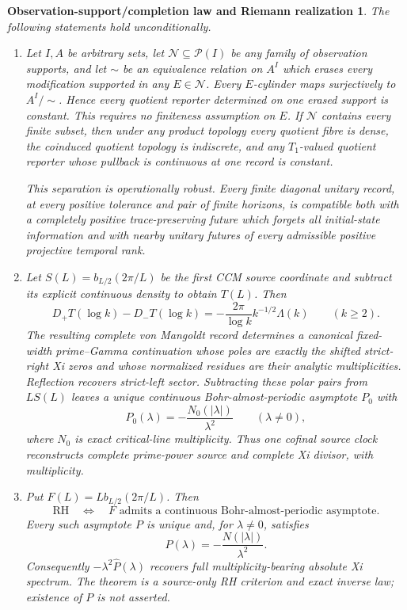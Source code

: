 \documentclass[11pt]{article}
\newtheorem*{maintheorem}{Observation-support/completion law and Riemann realization}
\theoremstyle{definition}
\theoremstyle{remark}
\begin{document}
\begin{maintheorem}\label{thm:main}
The following statements hold unconditionally.
\begin{enumerate}[label=\textup{(\roman*)}]
\item Let $I,A$ be arbitrary sets, let $\mathcal N\subseteq\mathcal P(I)$ be any family of
observation supports, and let $\sim$ be an equivalence relation on $A^I$ which erases every
modification supported in any $E\in\mathcal N$.  Every $E$-cylinder maps surjectively to
$A^I/{\sim}$.  Hence every quotient reporter determined on one erased support is constant.  This
requires no finiteness assumption on $E$.  If $\mathcal N$ contains every finite subset, then
under any product topology every quotient fibre is dense, the coinduced quotient topology is
indiscrete, and any $T_1$-valued quotient reporter whose pullback is continuous at one record is
constant.

This separation is operationally robust.  Every finite diagonal unitary record, at every positive
tolerance and pair of finite horizons, is compatible both with a completely positive
trace-preserving future which forgets all initial-state information and with nearby unitary
futures of every admissible positive projective temporal rank.

\item Let $S(L)=b_{L/2}(2\pi/L)$ be the first CCM source coordinate and subtract its explicit
continuous density to obtain $T(L)$.  Then
\[
 D_+T(\log k)-D_-T(\log k)
 =-\frac{2\pi}{\log k}k^{-1/2}\Lambda(k)\qquad(k\ge2).
\]
The resulting complete von Mangoldt record determines a canonical fixed-width prime--Gamma
continuation whose poles are exactly the shifted strict-right Xi zeros and whose normalized
residues are their analytic multiplicities.  Reflection recovers strict-left sector.  Subtracting
these polar pairs from $LS(L)$ leaves a unique continuous Bohr-almost-periodic asymptote $P_0$
with
\[
 \widehat P_0(\lambda)=-\frac{N_0(|\lambda|)}{\lambda^2}\qquad(\lambda\ne0),
\]
where $N_0$ is exact critical-line multiplicity.  Thus one cofinal source clock reconstructs
complete prime-power source and complete Xi divisor, with multiplicity.

\item Put $F(L)=L b_{L/2}(2\pi/L)$.  Then
\[
 \mathrm{RH}\quad\Longleftrightarrow\quad
 F\text{ admits a continuous Bohr-almost-periodic asymptote.}
\]
Every such asymptote $P$ is unique and, for $\lambda\ne0$, satisfies
\[
 \widehat P(\lambda)=-\frac{N(|\lambda|)}{\lambda^2}.
\]
Consequently $-\lambda^2\widehat P(\lambda)$ recovers full multiplicity-bearing absolute Xi
spectrum.  The theorem is a source-only RH criterion and exact inverse law; existence of $P$ is
not asserted.
\end{enumerate}
\end{maintheorem}
\end{document}
